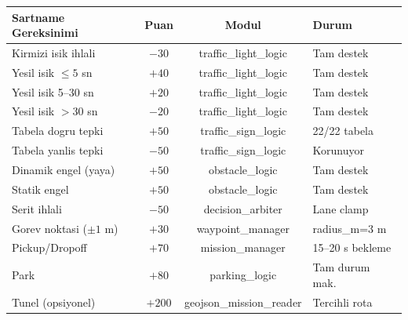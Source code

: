 \documentclass[a4paper,12pt]{article}
\begin{document}
\begin{center}
\renewcommand{\arraystretch}{1.2}
\begin{longtable}{p{5.0cm}ccp{4.0cm}}
  \toprule
  Sartname Gereksinimi   & Puan  & Modul                    & Durum\\
  \midrule
  \endhead
  Kirmizi isik ihlali    & $-30$ & traffic\_light\_logic     & Tam destek\\
  Yesil isik $\leq 5$ sn & $+40$ & traffic\_light\_logic     & Tam destek\\
  Yesil isik 5--30 sn    & $+20$ & traffic\_light\_logic     & Tam destek\\
  Yesil isik $>30$ sn    & $-20$ & traffic\_light\_logic     & Tam destek\\
  Tabela dogru tepki      & $+50$ & traffic\_sign\_logic      & 22/22 tabela\\
  Tabela yanlis tepki     & $-50$ & traffic\_sign\_logic      & Korunuyor\\
  Dinamik engel (yaya)    & $+50$ & obstacle\_logic           & Tam destek\\
  Statik engel            & $+50$ & obstacle\_logic           & Tam destek\\
  Serit ihlali            & $-50$ & decision\_arbiter         & Lane clamp\\
  Gorev noktasi ($\pm1$ m)& $+30$ & waypoint\_manager         & radius\_m=3 m\\
  Pickup/Dropoff          & $+70$ & mission\_manager          & 15--20 s bekleme\\
  Park                    & $+80$ & parking\_logic            & Tam durum mak.\\
  Tunel (opsiyonel)       &$+200$ & geojson\_mission\_reader  & Tercihli rota\\
  \bottomrule
\end{longtable}
\end{center}
\end{document}
